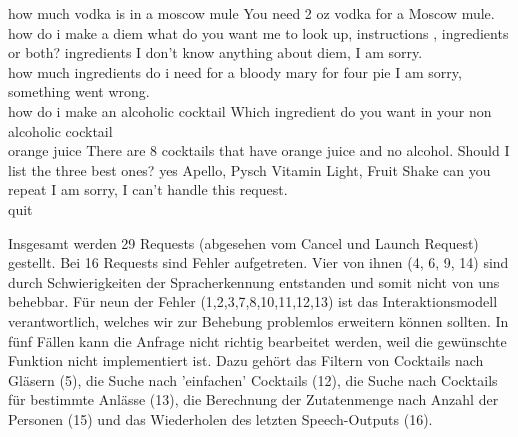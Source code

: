 \documentclass[12pt,letterpaper]{article}
\begin{document}
\begin{dialogue}
	 how much vodka is in a moscow mule
	 You need 2 oz vodka for a Moscow mule.
	 how do i make a diem
	 what do you want me to look up, instructions , ingredients or both?
	 ingredients
	 I don't know anything about diem, I am sorry. \\
	 how much ingredients do i need for a bloody mary for four pie
	 I am sorry, something went wrong. \\
	 how do i make an alcoholic cocktail
	 Which ingredient do you want in your non alcoholic cocktail \\
	 orange juice
	 There are 8 cocktails that have orange juice and no alcohol. Should I list the three best ones?
	 yes
	 Apello, Pysch Vitamin Light, Fruit Shake
	 can you repeat
	 I am sorry, I can't handle this request. \\
	 quit
\end{dialogue}

Insgesamt werden 29 Requests (abgesehen vom Cancel und Launch Request) gestellt. Bei 16 Requests sind Fehler aufgetreten. Vier von ihnen (4, 6, 9, 14) sind durch Schwierigkeiten der Spracherkennung entstanden und somit nicht von uns behebbar. Für neun der Fehler (1,2,3,7,8,10,11,12,13) ist das Interaktionsmodell verantwortlich, welches wir zur Behebung problemlos erweitern können sollten. In fünf Fällen kann die Anfrage nicht richtig bearbeitet werden, weil die gewünschte Funktion nicht implementiert ist. Dazu gehört das Filtern von Cocktails nach Gläsern (5), die Suche nach 'einfachen' Cocktails (12), die Suche nach Cocktails für bestimmte Anlässe (13), die Berechnung der Zutatenmenge nach Anzahl der Personen (15) und das Wiederholen des letzten Speech-Outputs (16).
\end{document}
